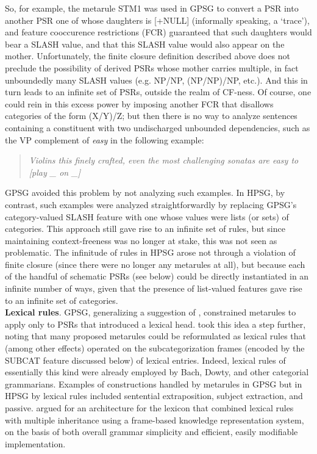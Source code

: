 \documentclass[output=paper]{langsci/langscibook}
\begin{document}
So, for example, the metarule STM1 was used in GPSG to convert a PSR into another PSR one of whose daughters is [+NULL] (informally speaking, a `trace'), and feature cooccurence restrictions (FCR) guaranteed that such daughters would bear a SLASH value, and that this SLASH value would also appear on the mother. Unfortunately, the finite closure definition described above does not preclude the possibility of derived PSRs whose mother carries multiple, in fact unboundedly many
SLASH values (e.g. NP/NP, (NP/NP)/NP, etc.). And this in turn leads to an infinite set of PSRs, outside the realm of CF-ness.  Of course, one could rein in this excess power by imposing another FCR that disallows categories of the form (X/Y)/Z; but then there is no way to analyze sentences containing a constituent with two undischarged unbounded dependencies, such as the VP complement of {\em easy} in the following example:

\begin{quote}
{\em Violins this finely crafted, even the most challenging sonatas are easy to [play \_ on \_]} 
\end{quote}

\noindent
GPSG avoided this problem by not analyzing such examples. In HPSG, by contrast, such examples were analyzed straightforwardly by replacing GPSG's category-valued SLASH feature with one whose values were lists (or sets) of categories. This approach still gave rise to an infinite set of rules, but since maintaining context-freeness was no longer at stake, this was not seen as problematic. The infinitude of rules in HPSG arose not through a violation of finite closure (since there were no longer any metarules at all), but because each of the handful of schematic PSRs (see below) could be directly instantiated in an infinite number of ways, given that the presence of list-valued
features gave rise to an infinite set of categories.\\

\noindent
{\bf Lexical rules}. GPSG, generalizing a suggestion of \citet{Flickinger1983}, constrained metarules to apply only to PSRs that introduced a lexical head. \citet{Pollard85a-u} took this idea a step further, noting that many proposed metarules could be reformulated as lexical rules that (among other effects) operated on the subcategorization frames (encoded by the SUBCAT feature discussed below) of lexical entries. Indeed, lexical rules of essentially this kind were already employed by Bach, Dowty, and other categorial grammarians. Examples of constructions handled by metarules in GPSG but in HPSG by lexical rules included sentential extraposition, subject extraction, and passive. \citet{FPW85a} argued for an architecture for the lexicon that combined lexical rules with multiple inheritance using a
frame-based knowledge representation system, on the basis of both overall grammar simplicity and efficient, easily modifiable implementation.\\
\end{document}

